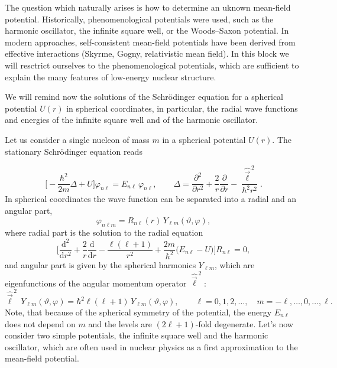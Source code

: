 \documentclass[11pt,a4paper]{article}
\newcommand{\op}[1]{\hat{#1}}
\newcommand{\ud}{\mathrm{d}}
\begin{document}
The question which naturally arises is how to determine an uknown mean-field potential. Historically, phenomenological potentials were used, such as the harmonic oscillator, the infinite square well, or the Woods--Saxon potential. In modern approaches, self-consistent mean-field potentials have been derived from effective interactions (Skyrme, Gogny, relativistic mean field). In this block we will resctrict ourselves to the phenomenological potentials, which are sufficient to explain the many features of low-energy nuclear structure.

We will remind now the solutions of the Schr\"odinger equation for a spherical potential $U(r)$ in spherical coordinates, in particular, the radial wave functions and energies of the infinite square well and of the harmonic oscillator. 

Let us consider a single nucleon of mass $m$ in a spherical potential $U(r)$. 
The stationary Schr\"odinger equation reads

\[
\Big[-\frac{\hbar^2}{2m}\Delta+U\Big]\varphi_{n\ell}=E_{n\ell}\,\varphi_{n\ell},
\qquad
\Delta=\frac{\partial^2}{\partial r^2}+\frac2r\frac{\partial}{\partial r}-\frac{\op{\vec\ell}^{\,2}}{\hbar^2r^2}.
\]
In spherical coordinates the wave function can be separated into a radial and an angular part,
\[
\varphi_{n\ell m}=R_{n\ell}(r)\,Y_{\ell m}(\vartheta,\varphi),
\]
where radial part is the solution to the radial equation
\[
\Big[\frac{\ud^2}{\ud r^2}+\frac2r\frac{\ud}{\ud r}-\frac{\ell(\ell+1)}{r^2}+\frac{2m}{\hbar^2}\big(E_{n\ell}-U\big)\Big]R_{n\ell}=0,
\]
and angular part is given by the spherical harmonics $Y_{\ell m}$, which are eigenfunctions of the angular momentum operator $\op{\vec\ell}^{\,2}$:
\[
\op{\vec\ell}^{\,2}\,Y_{\ell m}(\vartheta,\varphi)=\hbar^2\ell(\ell+1)\,Y_{\ell m}(\vartheta,\varphi),
\qquad \ell=0,1,2,\dots,\quad m=-\ell,\dots,0,\dots,\ell .
\]
Note, that because of the spherical symmetry of the potential, the energy $E_{n\ell}$ does not depend on $m$ and the levels are $(2\ell+1)$-fold degenerate. 
Let's now consider two simple potentials, the infinite square well and the harmonic oscillator, which are often used in nuclear physics as a first approximation to the mean-field potential.
\end{document}
